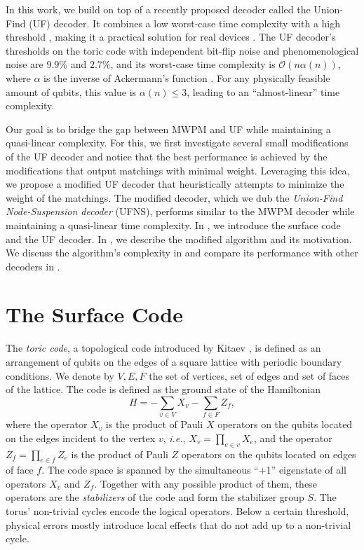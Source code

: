 In this work, we build on top of a recently proposed decoder called the Union-Find (UF) decoder. It combines a low worst-case time complexity with a high threshold \cite{delfosse2017almost}, making it a practical solution for real devices \cite{huang2020fault,delfosse2020hierarchical,das2020scalable}. The UF decoder's thresholds on the toric code with independent bit-flip noise and phenomenological noise are $9.9\%$ and $2.7\%$, and its worst-case time complexity is $\mathcal{O}(n\alpha(n))$, where $\alpha$ is the inverse of Ackermann's function \cite{tarjan1975efficiency}. For any physically feasible amount of qubits, this value is $\alpha(n) \leq 3$, leading to an ``almost-linear'' time complexity. 

Our goal is to bridge the gap between MWPM and UF while maintaining a quasi-linear complexity. For this, we first investigate several small modifications of the UF decoder and notice that the best performance is achieved by the modifications that output matchings with minimal weight. Leveraging this idea, we propose a modified UF decoder that heuristically attempts to minimize the weight of the matchings. The modified decoder, which we dub the \emph{Union-Find Node-Suspension decoder} (UFNS), performs similar to the MWPM decoder while maintaining a quasi-linear time complexity. In , we introduce the surface code and the UF decoder. In , we describe the modified algorithm and its motivation. We discuss the algorithm's complexity in  and compare its performance with other decoders in .  

\section{The Surface Code}\label{sec:surfacecode}

The \emph{toric code}, a topological code introduced by Kitaev \cite{kitaev2003fault}, is defined as an arrangement of qubits on the edges of a square lattice with periodic boundary conditions. We denote by $V,E,F$ the set of vertices, set of edges and set of faces of the lattice. The code is defined as the ground state of the Hamiltonian
\begin{equation}
    H = -\sum_{v \in V} X_v -\sum_{f \in F} Z_f, 
\end{equation}
where the operator $X_v$ is the product of Pauli $X$ operators on the qubits located on the edges incident to the vertex $v$, \emph{i.e.}, $X_v = \prod_{e \in v} X_e$, and the operator $Z_f = \prod_{e \in f} Z_e$ is the product of Pauli $Z$ operators on the qubits located on edges of face $f$. The code space is spanned by the simultaneous ``+1'' eigenstate of all operators $X_v$ and $Z_f$. Together with any possible product of them, these operators are the \emph{stabilizers} of the code and form the stabilizer group $S$. The torus' non-trivial cycles encode the logical operators. Below a certain threshold, physical errors mostly introduce local effects that do not add up to a non-trivial cycle. 

